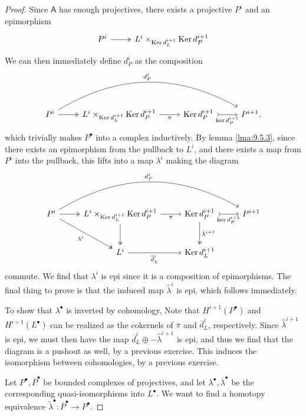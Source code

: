 \begin{proof}
	Since $\mathsf{A} $ has enough projectives, there exists a projective $P^i$ and an epimorphism
	\[\begin{tikzcd}[row sep = 2.5em, column sep = 2.5em]
		P^i\ar[r, two heads]&L^i\times_{\Ker d_L^{i+1} } \Ker d_P^{i+1} 
	\end{tikzcd}\]
We can then immediately define $d_P^{i} $ as the composition
\[\begin{tikzcd}[row sep = 2.5em, column sep = 2.5em]
	P^i\ar[rrr, bend left, "d_P^i"]\ar[r, two heads]&L^i\times_{\Ker d_L^{i+1} } \Ker d_P^{i+1} \ar[r, "\pi "']&\Ker d_P^{i+1} \ar[r, tail, "\ker d_P^{i+1} "']&P^{i+1} ,
\end{tikzcd}\]
which trivially makes $P^{\bullet} $ into a complex inductively. By lemma \ref{lma:9.5.3}, since there exists an epimorphism from the pullback to $L^i$, and there exists a map from $P^i$ into the pullback, this lifts into a map $\lambda^i$ making the diagram
\[\begin{tikzcd}[row sep = 2.5em, column sep = 2.5em]
P^i\ar[dr, "\lambda^i"', two heads]\ar[rrr, bend left, "d_P^i"]\ar[r, two heads]&L^i\times_{\Ker d_L^{i+1} } \Ker d_P^{i+1}\ar[d, two heads] \ar[r, "\pi "']&\Ker d_P^{i+1} \ar[r, tail, "\ker d_P^{i+1} "']\ar[d, two heads, "\hat{\lambda }^{i+1} "]&P^{i+1} \\
						      &L^i\ar[r, " \overline{d} _L^i"']&\Ker d_L^{i+1} 
\end{tikzcd}\]
commute. We find that $\lambda ^{i} $ is epi since it is a composition of epimorphisms. The final thing to prove is that the induced map $\hat{\lambda }^i$ is epi, which follows immediately.

To show that $\lambda ^{\bullet} $ is inverted by cohomology, Note that $H^{i+1} (P^{\bullet} )$ and $H^{i+1} (L^{\bullet} )$ can be realized as the cokernels of $\pi $ and $\overline{d} _L^i$, respectively. Since $\hat{\lambda }^{i+1} $ is epi, we must then have the map $\overline{d} ^i_L \oplus -\hat{\lambda }^{i+1} $ is epi, and thus we find that the diagram is a pushout as well, by a previous exercise. This induces the isomorphism between cohomologies, by a previous exercise.

Let $P^{\bullet} ,\overline{P} ^{\bullet} $ be bounded complexes of projectives, and let $\lambda ^{\bullet} , \overline{\lambda } ^{\bullet} $ be the corresponding quasi-isomorphisms into $L^{\bullet} $. We want to find a homotopy equivalence $\widetilde{\lambda } ^{\bullet} : \overline{P} ^{\bullet}  \to P^{\bullet} $.


\end{proof}
